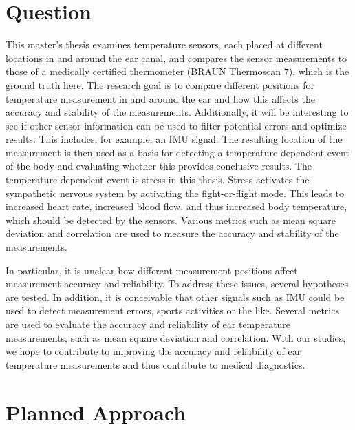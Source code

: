 \section{Question}
\label{ch:Introduction:Question}
This master's thesis examines temperature sensors, each placed at different locations in and around the ear canal, and compares the sensor measurements to those of a medically certified thermometer (BRAUN Thermoscan 7), which is the ground truth here.
The research goal is to compare different positions for temperature measurement in and around the ear and how this affects the accuracy and stability of the measurements.
Additionally, it will be interesting to see if other sensor information can be used to filter potential errors and optimize results. 
This includes, for example, an IMU signal. 
The resulting location of the measurement is then used as a basis for detecting a temperature-dependent event of the body and evaluating whether this provides conclusive results.
The temperature dependent event is stress in this thesis.
Stress activates the sympathetic nervous system by activating the fight-or-flight mode.
This leads to increased heart rate, increased blood flow, and thus increased body temperature, which should be detected by the sensors.
Various metrics such as mean square deviation and correlation are used to measure the accuracy and stability of the measurements.

In particular, it is unclear how different measurement positions affect measurement accuracy and reliability.
To address these issues, several hypotheses are tested. 
In addition, it is conceivable that other signals such as IMU could be used to detect measurement errors, sports activities or the like.
Several metrics are used to evaluate the accuracy and reliability of ear temperature measurements, such as mean square deviation and correlation.
With our studies, we hope to contribute to improving the accuracy and reliability of ear temperature measurements and thus contribute to medical diagnostics.

\section{Planned Approach}
\label{ch:Introduction:PlannedApproach}

